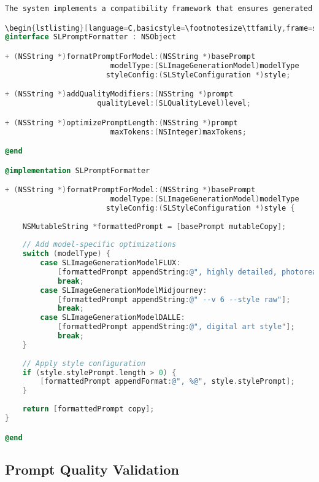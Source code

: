 \begin{table}[H]
\begin{table}[H]
\begin{lstlisting}[language=C,basicstyle=\footnotesize\ttfamily,frame=single,breaklines=true,columns=flexible,caption={Simple Caching Implementation},label={lst:simple_caching}]
The system implements a compatibility framework that ensures generated prompts are optimized for different text-to-image generation models while maintaining consistent quality and effectiveness:

\begin{lstlisting}[language=C,basicstyle=\footnotesize\ttfamily,frame=single,breaklines=true,columns=flexible,caption={Prompt Compatibility Implementation},label={lst:prompt_compatibility}]
@interface SLPromptFormatter : NSObject

+ (NSString *)formatPromptForModel:(NSString *)basePrompt 
                        modelType:(SLImageGenerationModel)modelType
                       styleConfig:(SLStyleConfiguration *)style;

+ (NSString *)addQualityModifiers:(NSString *)prompt 
                     qualityLevel:(SLQualityLevel)level;

+ (NSString *)optimizePromptLength:(NSString *)prompt 
                        maxTokens:(NSInteger)maxTokens;

@end

@implementation SLPromptFormatter

+ (NSString *)formatPromptForModel:(NSString *)basePrompt 
                        modelType:(SLImageGenerationModel)modelType
                       styleConfig:(SLStyleConfiguration *)style {
    
    NSMutableString *formattedPrompt = [basePrompt mutableCopy];
    
    // Add model-specific optimizations
    switch (modelType) {
        case SLImageGenerationModelFLUX:
            [formattedPrompt appendString:@", highly detailed, photorealistic"];
            break;
        case SLImageGenerationModelMidjourney:
            [formattedPrompt appendString:@" --v 6 --style raw"];
            break;
        case SLImageGenerationModelDALLE:
            [formattedPrompt appendString:@", digital art style"];
            break;
    }
    
    // Apply style configuration
    if (style.stylePrompt.length > 0) {
        [formattedPrompt appendFormat:@", %@", style.stylePrompt];
    }
    
    return [formattedPrompt copy];
}

@end
\end{lstlisting}

\subsection{Prompt Quality Validation}


\end{table}
\end{table}
